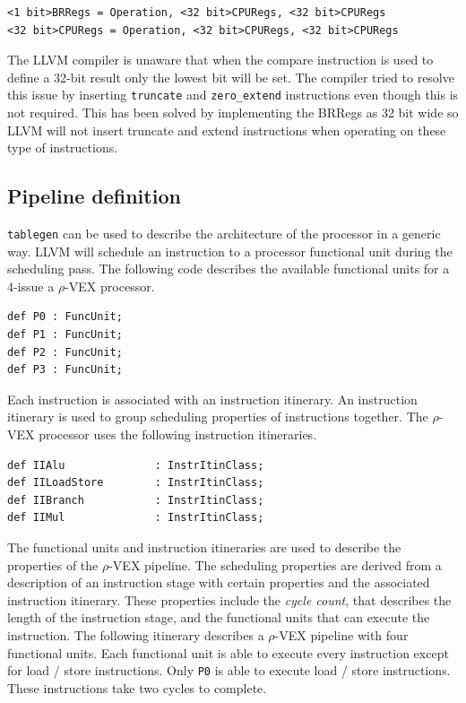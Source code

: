 \begin{lstlisting}
<1 bit>BRRegs = Operation, <32 bit>CPURegs, <32 bit>CPURegs
<32 bit>CPURegs = Operation, <32 bit>CPURegs, <32 bit>CPURegs
\end{lstlisting}

The LLVM compiler is unaware that when the compare instruction is used to define a 32-bit result only the lowest bit will be set. The compiler tried to resolve this issue by inserting \texttt{truncate} and \texttt{zero\_extend} instructions even though this is not required. This has been solved by implementing the BRRegs as 32 bit wide so LLVM will not insert truncate and extend instructions when operating on these type of instructions.

\subsection{Pipeline definition}
\texttt{tablegen} can be used to describe the architecture of the processor in a generic way. LLVM will schedule an instruction to a processor functional unit during the scheduling pass. The following code describes the available functional units for a 4-issue a $\rho$-VEX processor.

\begin{lstlisting}[language=tblgen]
def P0 : FuncUnit;
def P1 : FuncUnit;
def P2 : FuncUnit;
def P3 : FuncUnit;
\end{lstlisting}

Each instruction is associated with an instruction itinerary. An instruction itinerary is used to group scheduling properties of instructions together. The $\rho$-VEX processor uses the following instruction itineraries.

\begin{lstlisting}[language=tblgen]
def IIAlu              : InstrItinClass;
def IILoadStore        : InstrItinClass;
def IIBranch           : InstrItinClass;
def IIMul              : InstrItinClass;
\end{lstlisting}

The functional units and instruction itineraries are used to describe the properties of the $\rho$-VEX pipeline. The scheduling properties are derived from a description of an instruction stage with certain properties and the associated instruction itinerary. These properties include the \emph{cycle count}, that describes the length of the instruction stage, and the functional units that can execute the instruction. The following itinerary describes a $\rho$-VEX pipeline with four functional units. Each functional unit is able to execute every instruction except for load / store instructions. Only \texttt{P0} is able to execute load / store instructions. These instructions take two cycles to complete.

